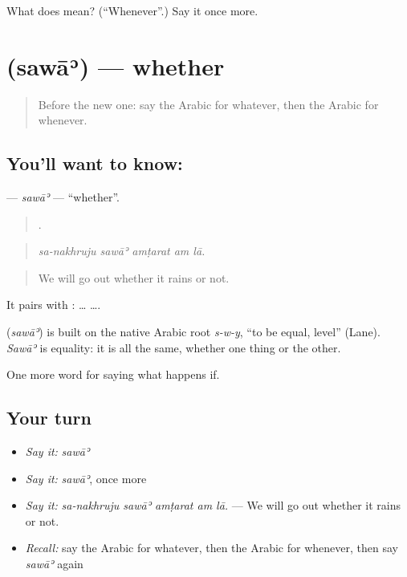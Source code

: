 \begin{tcolorbox}[breakable,colback=teal!4,colframe=teal!35!black,title={Before you move on}]
What does  mean? (\textquotedblleft{}Whenever\textquotedblright{}.) Say it once more.
\end{tcolorbox}
\section[\texorpdfstring{\ar{سواء} (sawāʾ)}{سواء (sawāʾ)}]{ (sawāʾ) — whether}

\label{lesson:AR-C400-sawa}



\begin{quote}
Before the new one: say the Arabic for whatever, then the Arabic for whenever.
\end{quote}

\subsection*{You'll want to know: }
\textbf{} — \emph{sawāʾ} — \textquotedblleft{}whether\textquotedblright{}.

\begin{quote}
    .
\end{quote}

\begin{quote}
\emph{sa-nakhruju sawāʾ amṭarat am lā.}
\end{quote}

\begin{quote}
We will go out whether it rains or not.
\end{quote}

It pairs with :  …  ….

\begin{cousinweb}
\textbf{} (\emph{sawāʾ}) is built on the native Arabic root \emph{s-w-y}, \textquotedblleft{}to be equal, level\textquotedblright{} (Lane). \emph{Sawāʾ} is equality: it is all the same, whether one thing or the other.
\end{cousinweb}

\begin{grammarlens}[title={What you've built}]
One more word for saying what happens if.
\end{grammarlens}

\subsection*{Your turn}
\begin{itemize}
\raggedright
  \item \emph{Say it:} \emph{sawāʾ}
  \item \emph{Say it:} \emph{sawāʾ}, once more
  \item \emph{Say it:} \emph{sa-nakhruju sawāʾ amṭarat am lā.} — We will go out whether it rains or not.
  \item \emph{Recall:} say the Arabic for whatever, then the Arabic for whenever, then say \emph{sawāʾ} again
\end{itemize}

